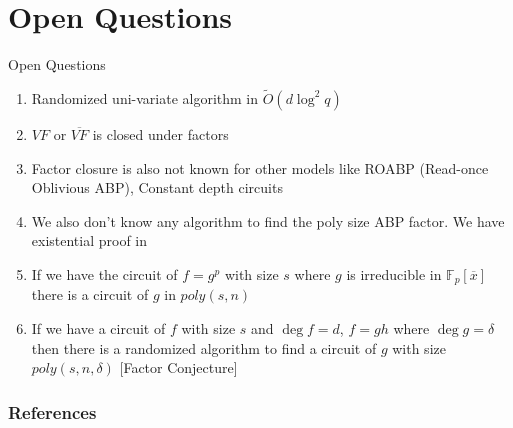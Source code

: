 \documentclass[10pt]{beamer}
\begin{document}
\section{Open Questions}
\begin{frame}{Open Questions}
    \begin{enumerate}
    	\item Randomized uni-variate algorithm in $\tilde{O}(d\log^2 q)$
        \item $VF$ or $\overline{VF}$ is closed under factors
        \item Factor closure is also not known for other models like ROABP (Read-once Oblivious ABP), Constant depth circuits
        \item We also don't know any algorithm to find the poly size ABP factor. We have existential proof in \cite{abpfactor}
        \item If we have the circuit of $f=g^p$ with size $s$ where $g$ is irreducible in $\mathbb{F}_p[\overline{x}]$ there is a circuit of $g$ in $poly(s,n)$
        \item  If we have a circuit of $f$ with size $s$ and $\deg f=d$, $f=gh$ where $\deg g =\delta$ then there is a randomized algorithm to find a circuit of $g$ with size $poly(s,n,\delta)$ [Factor Conjecture]
    \end{enumerate}
\end{frame}

\begin{frame}[allowframebreaks] %
	\frametitle{References}
	
		
			

\printbibliography
\end{frame}
\end{document}
